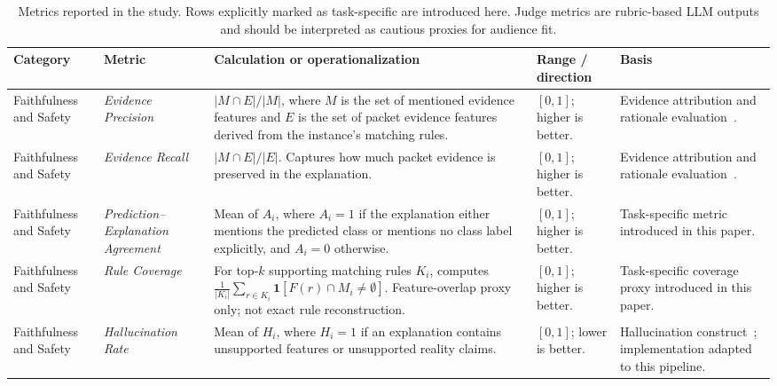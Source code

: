 \documentclass[sigconf]{acmart}
\begin{document}
\begin{table}[t!]
\caption{Metrics reported in the study. Rows explicitly marked as task-specific are introduced here. Judge metrics are rubric-based LLM outputs and should be interpreted as cautious proxies for audience fit.}
\vspace{-2mm}
\label{tab:metrics-main}
\centering
\scriptsize
\setlength{\tabcolsep}{1.5pt}
\renewcommand{\arraystretch}{1.00}
\begin{tabular}{>{\raggedright\arraybackslash}p{1.8cm}>{\raggedright\arraybackslash}p{2.8cm}>{\raggedright\arraybackslash}p{6cm}>{\raggedright\arraybackslash}p{2.5cm}>{\raggedright\arraybackslash}p{3.1cm}}
\toprule
\textbf{Category} & \textbf{Metric} & \textbf{Calculation or operationalization} & \textbf{Range / direction} & \textbf{Basis} \\
\midrule
Faithfulness and Safety & \emph{Evidence Precision} & $\lvert M \cap E \rvert / \lvert M \rvert$, where $M$ is the set of mentioned evidence features and $E$ is the set of packet evidence features derived from the instance's matching rules. & $[0,1]$; higher is better. & Evidence attribution and rationale evaluation~\cite{deyoung2020eraser,xing2025evidence}. \\
Faithfulness and Safety & \emph{Evidence Recall} & $\lvert M \cap E \rvert / \lvert E \rvert$. Captures how much packet evidence is preserved in the explanation. & $[0,1]$; higher is better. & Evidence attribution and rationale evaluation~\cite{deyoung2020eraser,xing2025evidence}. \\
Faithfulness and Safety & \emph{Prediction--Explanation Agreement} & Mean of $A_i$, where $A_i=1$ if the explanation either mentions the predicted class or mentions no class label explicitly, and $A_i=0$ otherwise. & $[0,1]$; higher is better. & Task-specific metric introduced in this paper. \\
Faithfulness and Safety & \emph{Rule Coverage} & For top-$k$ supporting matching rules $K_i$, computes $\frac{1}{|K_i|}\sum_{r \in K_i}\mathbf{1}[F(r)\cap M_i \neq \emptyset]$. Feature-overlap proxy only; not exact rule reconstruction. & $[0,1]$; higher is better. & Task-specific coverage proxy introduced in this paper. \\
Faithfulness and Safety & \emph{Hallucination Rate} & Mean of $H_i$, where $H_i=1$ if an explanation contains unsupported features or unsupported reality claims. & $[0,1]$; lower is better. & Hallucination construct~\cite{bang2025hallulens}; implementation adapted to this pipeline. \\

\end{tabular}
\end{table}
\end{document}
